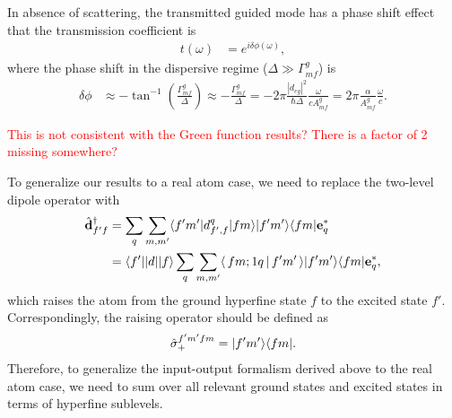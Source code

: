 \documentclass[preprint,aps,pra,onecolumn]{revtex4-1} %
\begin{document}
In absence of scattering, the transmitted guided mode has a phase shift effect that 
the transmission coefficient is
\begin{align}
t(\omega) &= e^{i\delta \phi(\omega)},
\end{align}
where the phase shift in the dispersive regime ($\Delta\gg \Gamma^g_{mf}$) is 
\begin{align}
\delta\phi &\approx -\tan^{-1}\left(\frac{\Gamma^g_{mf}}{\Delta} \right)\approx -\frac{\Gamma^g_{mf}}{\Delta}=-2\pi \frac{|d_{eg}|^2}{\hbar\Delta}\frac{\omega}{cA^g_{mf}}=2\pi \frac{\alpha}{A^g_{mf}}\frac{\omega}{c}.
\end{align}

\textcolor{red}{This is not consistent with the Green function results? There is a factor of 2 missing somewhere?}


To generalize our results to a real atom case, we need to replace the two-level dipole operator with
\begin{align}
	\hat{ \mathbf{d} }_{f' f}^\dagger  & = \sum_q \sum_{m, m'}  \langle{f' m'}\rvert d_{f',f}^q \lvert{f m}\rangle \lvert{f' m'}\rangle\langle{f m}\rvert \mathbf{e}_q^* \\
	& = \langle{ f' }\rvert| d | \lvert{ f }\rangle \sum_q \sum_{m, m'}  \langle\, f m; 1 q\,\vert\, f' m' \,\rangle \lvert{f' m'}\rangle\langle{f m}\rvert \mathbf{e}_q^*,
\end{align}
which raises the atom from the ground hyperfine state $f$ to the excited state $f'$. Correspondingly, the raising operator should be defined as
\begin{align}
\hat{\sigma}_+^{f'm'fm} = \lvert{f' m'}\rangle\langle{f m}\rvert.
\end{align}
Therefore, to generalize the input-output formalism derived above to the real atom case, we need to sum over all relevant ground states and excited states in terms of hyperfine sublevels.
\end{document}
